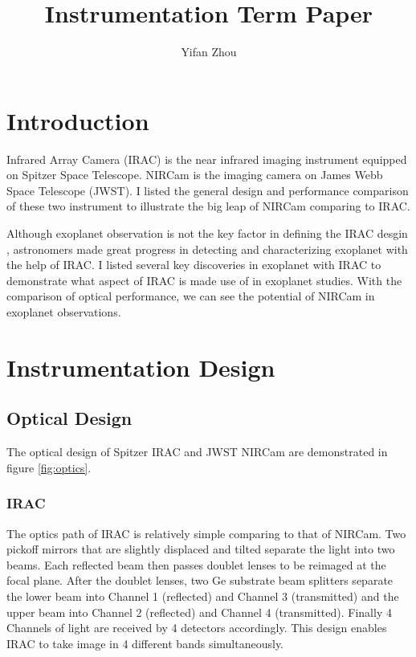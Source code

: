 \documentclass[preprint, 12pt]{aastex}
\begin{document}

\title{Instrumentation Term Paper}
\author{Yifan Zhou}

\section{Introduction}
Infrared Array Camera (IRAC) is the near infrared imaging instrument equipped
on Spitzer Space Telescope. NIRCam is the imaging camera on James Webb
Space Telescope (JWST). I listed the general design and performance
comparison of these two instrument to illustrate the big leap of
NIRCam comparing to IRAC.

Although exoplanet observation is not the key factor in defining
the IRAC desgin \citep{2004ApJS..154...10F}, astronomers made great progress in detecting and
characterizing exoplanet with the help of IRAC. I listed several key
discoveries in exoplanet with IRAC to demonstrate what aspect of IRAC
is made use of in exoplanet studies. With the comparison of optical
performance, we can see the potential of NIRCam in exoplanet
observations. 

\section{Instrumentation Design}
\subsection{Optical Design}

The optical design of Spitzer IRAC and JWST NIRCam are demonstrated in
figure \ref{fig:optics}.\par

\subsubsection{IRAC}
The optics path of IRAC is relatively simple comparing to that of
NIRCam. Two pickoff mirrors that are slightly displaced and tilted
separate the light into two beams. Each reflected beam then passes
doublet lenses to be reimaged at the focal plane. After the doublet
lenses, two Ge substrate beam splitters separate the lower beam into
Channel 1 (reflected) and Channel 3 (transmitted) and the upper beam
into Channel 2 (reflected) and Channel 4 (transmitted). Finally 4
Channels of light are received by 4 detectors accordingly. This design
enables IRAC to take image in 4 different bands simultaneously.\par
\end{document}
